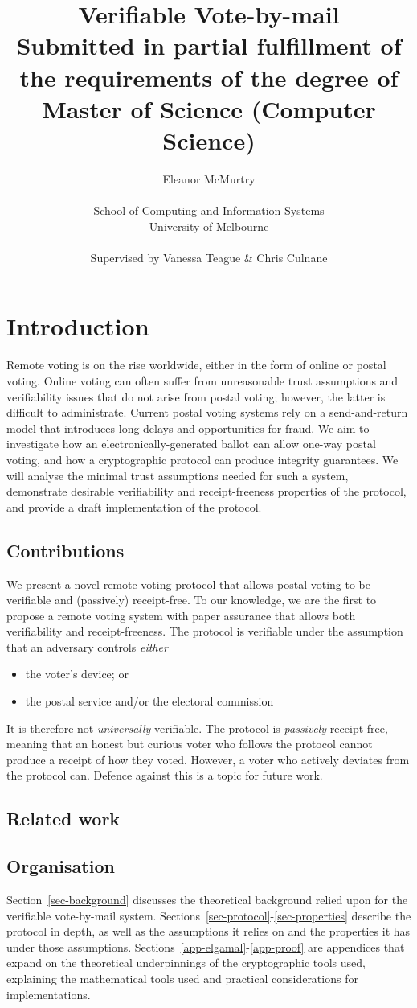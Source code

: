 \documentclass[11pt,twoside,a4paper]{article}
\title{Verifiable Vote-by-mail\\\large Submitted in partial fulfillment of the requirements of the degree of Master of Science (Computer Science)}
\author{Eleanor McMurtry\\\\School of Computing and Information Systems\\University of Melbourne\\\\Supervised by Vanessa Teague \& Chris Culnane}
\theoremstyle{definition}
\begin{document}
\maketitle
\pagebreak
\tableofcontents
\vfill\pagebreak
\section{Introduction}
Remote voting is on the rise worldwide, either in the form of online or postal voting. Online voting can often suffer from unreasonable trust assumptions and verifiability issues that do not arise from postal voting; however, the latter is difficult to administrate. Current postal voting systems rely on a send-and-return model that introduces long delays and opportunities for fraud. We aim to investigate how an electronically-generated ballot can allow one-way postal voting, and how a cryptographic protocol can produce integrity guarantees. We will analyse the minimal trust assumptions needed for such a system, demonstrate desirable verifiability and receipt-freeness properties of the protocol, and provide a draft implementation of the protocol.
\subsection{Contributions}
We present a novel remote voting protocol that allows postal voting to be verifiable and (passively) receipt-free. To our knowledge, we are the first to propose a remote voting system with paper assurance that allows both verifiability and receipt-freeness. The protocol is verifiable under the assumption that an adversary controls \textit{either}
\begin{itemize}
    \item the voter's device; or
    \item the postal service and/or the electoral commission
\end{itemize}
It is therefore not \textit{universally} verifiable. The protocol is \textit{passively} receipt-free, meaning that an honest but curious voter who follows the protocol cannot produce a receipt of how they voted. However, a voter who actively deviates from the protocol can. Defence against this is a topic for future work.
\subsection{Related work}
\subsection{Organisation}
Section~\ref{sec-background} discusses the theoretical background relied upon for the verifiable vote-by-mail system. Sections~\ref{sec-protocol}-\ref{sec-properties} describe the protocol in depth, as well as the assumptions it relies on and the properties it has under those assumptions. Sections~\ref{app-elgamal}-\ref{app-proof}  are appendices that expand on the theoretical underpinnings of the cryptographic tools used, explaining the mathematical tools used and practical considerations for implementations.
\end{document}
